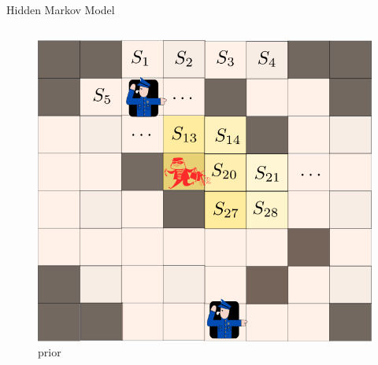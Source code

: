 \documentclass{beamer}
\theoremstyle{remark}
\begin{document}
\begin{frame}{Hidden Markov Model}
\begin{columns}
		\begin{column}{.33\textwidth}
			\begin{figure}
				\centering
				\includegraphics[width=0.9\linewidth]{prior2.png}
				\vspace{-10pt}
				\caption*{\tiny prior}


\end{figure}
\end{column}
\end{columns}
\end{frame}
\end{document}
